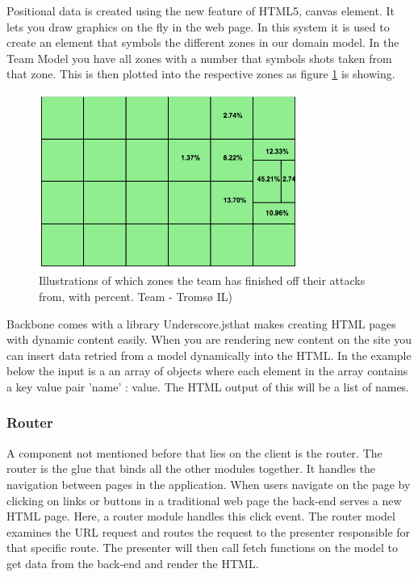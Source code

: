 Positional data is created using the new feature of HTML5, canvas element. It lets you draw graphics on the fly in the web page. In this system it is used to create an element that symbols the different zones in our domain model. In the Team Model you have all zones with a number that symbols shots taken from that zone. This is then plotted into the respective zones as figure \ref{fig:attacking_zones} is showing.

\begin{figure}[ht!]
\centering
\includegraphics[width=85mm]{images/general/finishing_zones.png}
\caption{Illustrations of which zones the team has finished off their attacks from, with percent. Team - Tromsø IL)}
\label{fig:attacking_zones}
\end{figure}

Backbone comes with a library Underscore.js\footnotemark that makes creating HTML pages with dynamic content easily. When you are rendering new content on the site you can insert data retried from a model dynamically into the HTML. In the example below the input is a an array of objects where each element in the array contains a key value pair 'name' : value. The HTML output of this will be a list of names.




\subsubsection{Router}

A component not mentioned before that lies on the client is the router. The router is the glue that binds all the other modules together. It handles the navigation between pages in the application. When users navigate on the page by clicking on links or buttons in a traditional web page the back-end serves a new HTML page. Here, a router module handles this click event. The router model examines the URL request and routes the request to the presenter responsible for that specific route. The presenter will then call fetch functions on the model to get data from the back-end and render the HTML.

